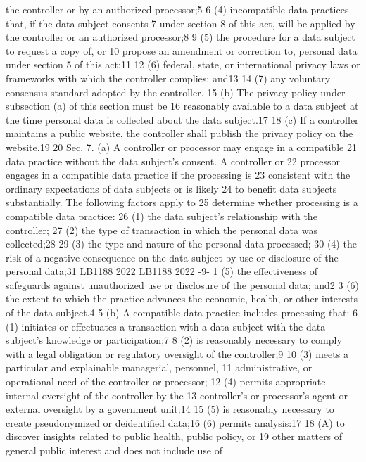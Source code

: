 the controller or by an authorized processor;5
6 (4) incompatible data practices that, if the data subject consents
7 under section 8 of this act, will be applied by the controller or an
authorized processor;8
9 (5) the procedure for a data subject to request a copy of, or
10 propose an amendment or correction to, personal data under section 5 of
this act;11
12 (6) federal, state, or international privacy laws or frameworks with
which the controller complies; and13
14 (7) any voluntary consensus standard adopted by the controller.
15 (b) The privacy policy under subsection (a) of this section must be
16 reasonably available to a data subject at the time personal data is
collected about the data subject.17
18 (c) If a controller maintains a public website, the controller shall
publish the privacy policy on the website.19
20 Sec. 7. (a) A controller or processor may engage in a compatible
21 data practice without the data subject's consent. A controller or
22 processor engages in a compatible data practice if the processing is
23 consistent with the ordinary expectations of data subjects or is likely
24 to benefit data subjects substantially. The following factors apply to
25 determine whether processing is a compatible data practice:
26 (1) the data subject's relationship with the controller;
27 (2) the type of transaction in which the personal data was
collected;28
29 (3) the type and nature of the personal data processed;
30 (4) the risk of a negative consequence on the data subject by use or
disclosure of the personal data;31
LB1188
2022
LB1188
2022
-9-
1 (5) the effectiveness of safeguards against unauthorized use or
disclosure of the personal data; and2
3 (6) the extent to which the practice advances the economic, health,
or other interests of the data subject.4
5 (b) A compatible data practice includes processing that:
6 (1) initiates or effectuates a transaction with a data subject with
the data subject's knowledge or participation;7
8 (2) is reasonably necessary to comply with a legal obligation or
regulatory oversight of the controller;9
10 (3) meets a particular and explainable managerial, personnel,
11 administrative, or operational need of the controller or processor;
12 (4) permits appropriate internal oversight of the controller by the
13 controller's or processor's agent or external oversight by a government
unit;14
15 (5) is reasonably necessary to create pseudonymized or deidentified
data;16
(6) permits analysis:17
18 (A) to discover insights related to public health, public policy, or
19 other matters of general public interest and does not include use of
